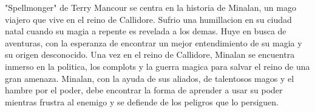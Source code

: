 
"Spellmonger" de Terry Mancour se centra en la historia de Minalan, un mago viajero que vive en el reino de Callidore. Sufrio una humillacion en su ciudad natal cuando su magia a repente es revelada  a los demas. Huye en busca de aventuras, con la esperanza de encontrar un mejor entendimiento de su magia y su origen desconocido. Una vez en el reino de Callidore, Minalan se encuentra inmerso en la politica, los complots y la guerra magica para salvar el reino de una gran amenaza. Minalan, con la ayuda de sus aliados, de talentosos magos y el hambre por el poder, debe encontrar la forma de aprender a usar su poder mientras frustra al enemigo y se defiende de los peligros que lo persiguen.